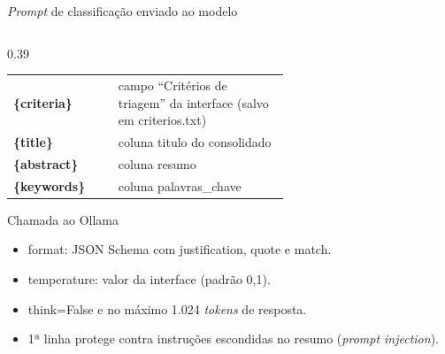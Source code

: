 \documentclass[aspectratio=169, 10pt]{beamer}
\newcommand{\pvar}[1]{\textcolor{accentgold}{\textbf{\{#1\}}}}
\newcommand{\cod}[1]{{\ttfamily\color{radargreen}#1}}
\begin{document}
\begin{frame}[t]{\emph{Prompt} de classificação enviado ao modelo}
\begin{columns}[T,onlytextwidth]
\begin{column}{0.39\textwidth}
\begin{tabular}{@{}l >{\raggedright\arraybackslash}p{0.62\linewidth}@{}}
        \toprule
        \pvar{criteria} & campo ``Critérios de triagem'' da interface (salvo em \cod{criterios.txt}) \\
        \pvar{title}    & coluna \cod{titulo} do consolidado \\
        \pvar{abstract} & coluna \cod{resumo} \\
        \pvar{keywords} & coluna \cod{palavras\_chave} \\
        \bottomrule
      \end{tabular}
      \vspace{5pt}
      \begin{block}{Chamada ao Ollama}
        \tiny
        \begin{itemize}\setlength{\itemsep}{1pt}
          \item \cod{format}: JSON Schema com \cod{justification}, \cod{quote} e \cod{match}.
          \item \cod{temperature}: valor da interface (padrão 0,1).
          \item \cod{think=False} e no máximo 1.024 \emph{tokens} de resposta.
          \item 1ª linha protege contra instruções escondidas no resumo (\emph{prompt injection}).
        \end{itemize}
      \end{block}
    \end{column}
  \end{columns}
\end{frame}
\end{document}
